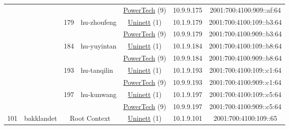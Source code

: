 \begin{small}
\begin{center}
\begin{longtable}{|c|c|c|c|c|c|c|c|}
  &  &  &  & \multicolumn{2}{|c|}{\tiny{\href{http://www.powertech.no}{PowerTech} (9)}} & \tiny{10.9.9.175} & \tiny{2001:700:4100:909::af:64} \\* \cline{3-3}\cline{4-4}\cline{5-5}\cline{6-6}\cline{7-7}\cline{8-8}
  &  & \multirow{2}{*}{\tiny{179}} & \multicolumn{1}{|l|}{\multirow{2}{*}{\tiny{hu-zhoufeng}}} & \multicolumn{2}{|c|}{\tiny{\href{https://www.uninett.no}{Uninett} (1)}} & \tiny{10.1.9.179} & \tiny{2001:700:4100:109::b3:64} \\* \cline{5-5}\cline{6-6}\cline{7-7}\cline{8-8}
  &  &  &  & \multicolumn{2}{|c|}{\tiny{\href{http://www.powertech.no}{PowerTech} (9)}} & \tiny{10.9.9.179} & \tiny{2001:700:4100:909::b3:64} \\* \cline{3-3}\cline{4-4}\cline{5-5}\cline{6-6}\cline{7-7}\cline{8-8}
  &  & \multirow{2}{*}{\tiny{184}} & \multicolumn{1}{|l|}{\multirow{2}{*}{\tiny{hu-yuyintan}}} & \multicolumn{2}{|c|}{\tiny{\href{https://www.uninett.no}{Uninett} (1)}} & \tiny{10.1.9.184} & \tiny{2001:700:4100:109::b8:64} \\* \cline{5-5}\cline{6-6}\cline{7-7}\cline{8-8}
  &  &  &  & \multicolumn{2}{|c|}{\tiny{\href{http://www.powertech.no}{PowerTech} (9)}} & \tiny{10.9.9.184} & \tiny{2001:700:4100:909::b8:64} \\* \cline{3-3}\cline{4-4}\cline{5-5}\cline{6-6}\cline{7-7}\cline{8-8}
  &  & \multirow{2}{*}{\tiny{193}} & \multicolumn{1}{|l|}{\multirow{2}{*}{\tiny{hu-tanqilin}}} & \multicolumn{2}{|c|}{\tiny{\href{https://www.uninett.no}{Uninett} (1)}} & \tiny{10.1.9.193} & \tiny{2001:700:4100:109::c1:64} \\* \cline{5-5}\cline{6-6}\cline{7-7}\cline{8-8}
  &  &  &  & \multicolumn{2}{|c|}{\tiny{\href{http://www.powertech.no}{PowerTech} (9)}} & \tiny{10.9.9.193} & \tiny{2001:700:4100:909::c1:64} \\* \cline{3-3}\cline{4-4}\cline{5-5}\cline{6-6}\cline{7-7}\cline{8-8}
  &  & \multirow{2}{*}{\tiny{197}} & \multicolumn{1}{|l|}{\multirow{2}{*}{\tiny{hu-kunwang}}} & \multicolumn{2}{|c|}{\tiny{\href{https://www.uninett.no}{Uninett} (1)}} & \tiny{10.1.9.197} & \tiny{2001:700:4100:109::c5:64} \\* \cline{5-5}\cline{6-6}\cline{7-7}\cline{8-8}
  &  &  &  & \multicolumn{2}{|c|}{\tiny{\href{http://www.powertech.no}{PowerTech} (9)}} & \tiny{10.9.9.197} & \tiny{2001:700:4100:909::c5:64} \\ \hline
 \multirow{34}{*}{\tiny{101}} & \multicolumn{1}{|l|}{\multirow{34}{*}{\tiny{bakklandet}}} & \multicolumn{2}{|c|}{\multirow{2}{*}{\tiny{Root Context}}} & \multicolumn{2}{|c|}{\tiny{\href{https://www.uninett.no}{Uninett} (1)}} & \tiny{10.1.9.101} & \tiny{2001:700:4100:109::65} \\* \cline{5-5}\cline{6-6}\cline{7-7}\cline{8-8}

\end{longtable}
\end{center}
\end{small}
